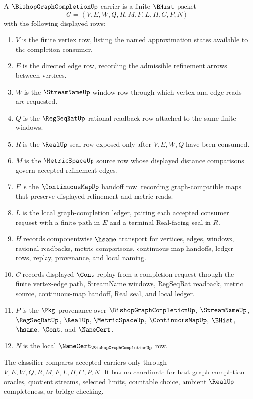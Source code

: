 \begin{definition}
\label{def:bishop-graph-completion-carrier}
A $\BishopGraphCompletionUp$ carrier is a finite $\BHist$ packet
$$
G=(V,E,W,Q,R,M,F,L,H,C,P,N)
$$
with the following displayed rows:
\begin{enumerate}
\item $V$ is the finite vertex row, listing the named approximation states available to the completion consumer.
\item $E$ is the directed edge row, recording the admissible refinement arrows between vertices.
\item $W$ is the $\StreamNameUp$ window row through which vertex and edge reads are requested.
\item $Q$ is the $\RegSeqRatUp$ rational-readback row attached to the same finite windows.
\item $R$ is the $\RealUp$ seal row exposed only after $V,E,W,Q$ have been consumed.
\item $M$ is the $\MetricSpaceUp$ source row whose displayed distance comparisons govern accepted refinement edges.
\item $F$ is the $\ContinuousMapUp$ handoff row, recording graph-compatible maps that preserve displayed refinement and metric reads.
\item $L$ is the local graph-completion ledger, pairing each accepted consumer request with a finite path in $E$ and a terminal Real-facing seal in $R$.
\item $H$ records componentwise $\hsame$ transport for vertices, edges, windows, rational readbacks, metric comparisons, continuous-map handoffs, ledger rows, replay, provenance, and local naming.
\item $C$ records displayed $\Cont$ replay from a completion request through the finite vertex-edge path, StreamName windows, RegSeqRat readback, metric source, continuous-map handoff, Real seal, and local ledger.
\item $P$ is the $\Pkg$ provenance over $\BishopGraphCompletionUp$, $\StreamNameUp$, $\RegSeqRatUp$, $\RealUp$, $\MetricSpaceUp$, $\ContinuousMapUp$, $\BHist$, $\hsame$, $\Cont$, and $\NameCert$.
\item $N$ is the local $\NameCert_{\BishopGraphCompletionUp}$ row.
\end{enumerate}
The classifier compares accepted carriers only through $V,E,W,Q,R,M,F,L,H,C,P,N$. It has no coordinate for host graph-completion oracles, quotient streams, selected limits, countable choice, ambient $\RealUp$ completeness, or bridge checking.
\end{definition}

